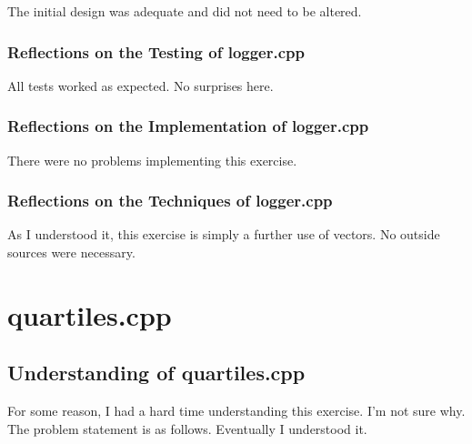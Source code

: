 \documentclass[11pt, oneside]{memoir}
\begin{document}
The initial design was adequate and did not need to be altered.


\subsubsection{Reflections on the Testing of logger.cpp}

All tests worked as expected.  No surprises here.



\subsubsection{Reflections on the Implementation of logger.cpp}

There were no problems implementing this exercise.



\subsubsection{Reflections on the Techniques of logger.cpp}

As I understood it, this exercise is simply a further use of vectors.
No outside sources were necessary. 





\section{quartiles.cpp}

\subsection{Understanding of quartiles.cpp}

For some reason, I had a hard time understanding this exercise.  I'm
not sure why.  The problem statement is as follows.  Eventually I
understood it. 
\end{document}

